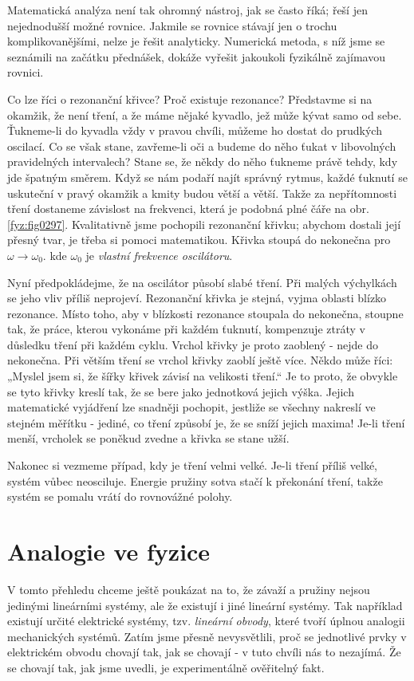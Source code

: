     Matematická analýza není tak ohromný nástroj, jak se často říká; řeší jen nejednodušší možné 
    rovnice. Jakmile se rovnice stávají jen o trochu komplikovanějšími, nelze je řešit analyticky. 
    Numerická metoda, s níž jsme se seznámili na začátku přednášek, dokáže vyřešit jakoukoli 
    fyzikálně zajímavou rovnici.
    
    Co lze říci o rezonanční křivce? Proč existuje rezonance? Představme si na okamžik, že není 
    tření, a že máme nějaké kyvadlo, jež může kývat samo od sebe. Ťukneme-li do kyvadla vždy v 
    pravou chvíli, můžeme ho dostat do prudkých oscilací. Co se však stane, zavřeme-li oči a budeme 
    do něho ťukat v libovolných pravidelných intervalech? Stane se, že někdy do něho ťukneme právě 
    tehdy, kdy jde špatným směrem. Když se nám podaří najít správný rytmus, každé ťuknutí se 
    uskuteční v pravý okamžik a kmity budou větší a větší. Takže za nepřítomnosti tření dostaneme 
    závislost na frekvenci, která je podobná plné čáře na obr. \ref{fyz:fig0297}. Kvalitativně jsme 
    pochopili rezonanční křivku; abychom dostali její přesný tvar, je třeba si pomoci matematikou. 
    Křivka stoupá do nekonečna pro \(\omega\rightarrow\omega_0\). kde \(\omega_0\) je \emph{vlastní 
    frekvence oscilátoru}.
    
    Nyní předpokládejme, že na oscilátor působí slabé tření. Při malých výchylkách se jeho vliv 
    příliš neprojeví. Rezonanční křivka je stejná, vyjma oblasti blízko rezonance. Místo toho, aby 
    v blízkosti rezonance stoupala do nekonečna, stoupne tak, že práce, kterou vykonáme při každém 
    ťuknutí, kompenzuje ztráty v důsledku tření při každém cyklu. Vrchol křivky je proto zaoblený - 
    nejde do nekonečna. Při větším tření se vrchol křivky zaoblí ještě více. Někdo může říci: 
    „Myslel jsem si, že šířky křivek závisí na velikosti tření.“ Je to proto, že obvykle se tyto 
    křivky kreslí tak, že se bere jako jednotková jejich výška. Jejich matematické vyjádření lze 
    snadněji pochopit, jestliže se všechny nakreslí ve stejném měřítku - jediné, co tření způsobí 
    je, že se sníží jejich maxima! Je-li tření menší, vrcholek se poněkud zvedne a křivka se stane 
    užší.
    
    Nakonec si vezmeme případ, kdy je tření velmi velké. Je-li tření příliš velké, systém vůbec 
    neosciluje. Energie pružiny sotva stačí k překonání tření, takže systém se pomalu vrátí do 
    rovnovážné polohy.
    
  \section{Analogie ve fyzice}\label{fyz:IchapXXVsecIV}
    V tomto přehledu chceme ještě poukázat na to, že závaží a pružiny nejsou jedinými lineárními 
    systémy, ale že existují i jiné lineární systémy. Tak například existují určité elektrické 
    systémy, tzv. \emph{lineární obvody}, které tvoří úplnou analogii mechanických systémů. Zatím 
    jsme přesně nevysvětlili, proč se jednotlivé prvky v elektrickém obvodu chovají tak, jak se 
    chovají - v tuto chvíli nás to nezajímá. Že se chovají tak, jak jsme uvedli, je experimentálně 
    ověřitelný fakt.
    
